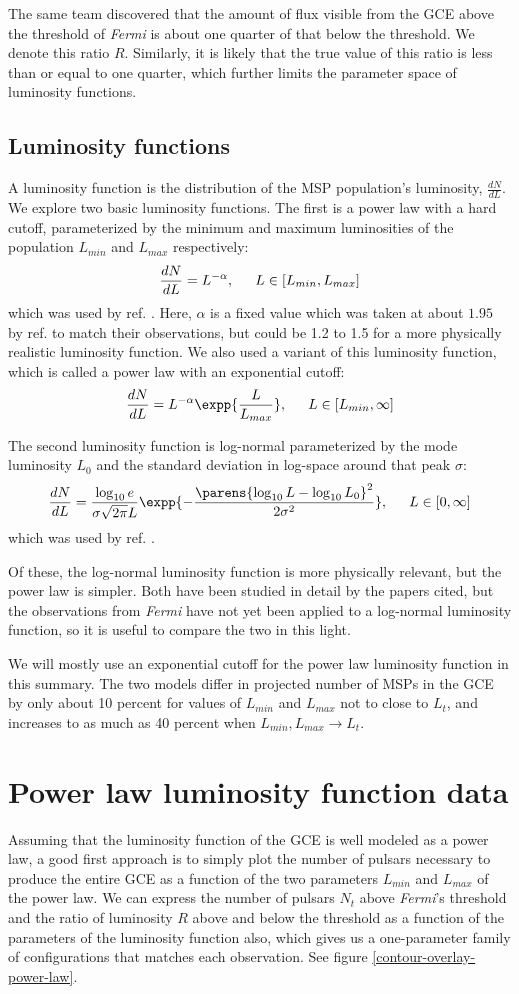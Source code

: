 \documentclass{C://Aliases//Dropbox-MIT//Latex_Templates//personal}
\begin{document}
The same team discovered that the amount of flux visible from the GCE above the threshold of \textit{Fermi} is about one quarter of that below the threshold. We denote this ratio $R$. Similarly, it is likely that the true value of this ratio is less than or equal to one quarter, which further limits the parameter space of luminosity functions.


\subsection{Luminosity functions}
A luminosity function is the distribution of the MSP population's luminosity, $\frac{dN}{dL}$. We explore two basic luminosity functions. The first is a power law with a hard cutoff, parameterized by the minimum and maximum luminosities of the population $L_{min}$ and $L_{max}$ respectively: 
$$\frac{dN}{dL} = L^{-\alpha}, \indent L\in [L_{min}, L_{max}]$$
which was used by ref. \cite{fermilab}. Here, $\alpha$ is a fixed value which was taken at about $1.95$ by ref. \cite{fermilab} to match their observations, but could be 1.2 to 1.5 for a more physically realistic luminosity function. We also used a variant of this luminosity function, which is called a power law with an exponential cutoff:
$$\frac{dN}{dL} = L^{-\alpha}\expp{\frac{L}{L_{max}}}, \indent L\in [L_{min}, \infty]$$

The second luminosity function is log-normal parameterized by the mode luminosity $L_0$ and the standard deviation in log-space around that peak $\sigma$: 
$$\frac{dN}{dL} = \frac{\log_{10}e}{\sigma \sqrt{2\pi} L}\expp{-\frac{\parens{\log_{10} L - \log_{10}L_0}^2}{2\sigma^2}}, \indent L\in [0, \infty]$$
which was used by ref. \cite{log-normal}.

Of these, the log-normal luminosity function is more physically relevant, but the power law is simpler. Both have been studied in detail by the papers cited, but the observations from \textit{Fermi} have not yet been applied to a log-normal luminosity function, so it is useful to compare the two in this light.

We will mostly use an exponential cutoff for the power law luminosity function in this summary. The two models differ in projected number of MSPs in the GCE by only about 10 percent for values of $L_{min}$ and $L_{max}$ not to close to $L_t$, and increases to as much as 40 percent when $L_{min}, L_{max} \rightarrow L_t$.



\section{Power law luminosity function data}
Assuming that the luminosity function of the GCE is well modeled as a power law, a good first approach is to simply plot the number of pulsars necessary to produce the entire GCE as a function of the two parameters $L_{min}$ and $L_{max}$ of the power law. We can express the number of pulsars $N_t$ above \textit{Fermi}'s threshold and the ratio of luminosity $R$ above and below the threshold as a function of the parameters of the luminosity function also, which gives us a one-parameter family of configurations that matches each observation. See figure \ref{contour-overlay-power-law}. 
\end{document}

